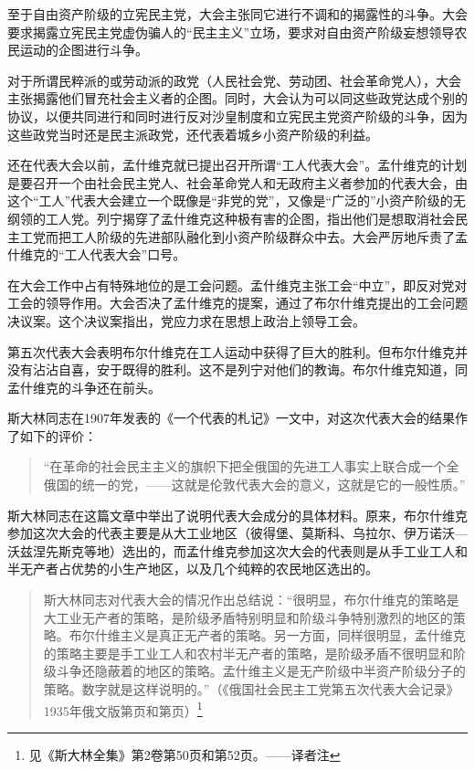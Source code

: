 至于自由资产阶级的立宪民主党，大会主张同它进行不调和的揭露性的斗争。大会要求揭露立宪民主党虚伪骗人的“民主主义”立场，要求对自由资产阶级妄想领导农民运动的企图进行斗争。

对于所谓民粹派的或劳动派的政党（人民社会党、劳动团、社会革命党人），大会主张揭露他们冒充社会主义者的企图。同时，大会认为可以同这些政党达成个别的协议，以便共同进行和同时进行反对沙皇制度和立宪民主党资产阶级的斗争，因为这些政党当时还是民主派政党，还代表着城乡小资产阶级的利益。

还在代表大会以前，孟什维克就已提出召开所谓“工人代表大会”。孟什维克的计划是要召开一个由社会民主党人、社会革命党人和无政府主义者参加的代表大会，由这个“工人”代表大会建立一个既像是“非党的党”，又像是“广泛的”小资产阶级的无纲领的工人党。列宁揭穿了孟什维克这种极有害的企图，指出他们是想取消社会民主工党而把工人阶级的先进部队融化到小资产阶级群众中去。大会严厉地斥责了孟什维克的“工人代表大会”口号。

在大会工作中占有特殊地位的是工会问题。孟什维克主张工会“中立”，即反对党对工会的领导作用。大会否决了孟什维克的提案，通过了布尔什维克提出的工会问题决议案。这个决议案指出，党应力求在思想上政治上领导工会。

第五次代表大会表明布尔什维克在工人运动中获得了巨大的胜利。但布尔什维克并没有沾沾自喜，安于既得的胜利。这不是列宁对他们的教诲。布尔什维克知道，同孟什维克的斗争还在前头。

斯大林同志在1907年发表的《一个代表的札记》一文中，对这次代表大会的结果作了如下的评价：

\begin{quotation}
“在革命的社会民主主义的旗帜下把全俄国的先进工人事实上联合成一个全俄国的统一的党，——这就是伦敦代表大会的意义，这就是它的一般性质。”
\end{quotation}

斯大林同志在这篇文章中举出了说明代表大会成分的具体材料。原来，布尔什维克参加这次大会的代表主要是从大工业地区（彼得堡、莫斯科、乌拉尔、伊万诺沃—沃兹涅先斯克等地）选出的，而孟什维克参加这次大会的代表则是从手工业工人和半无产者占优势的小生产地区，以及几个纯粹的农民地区选出的。

\begin{quotation}
斯大林同志对代表大会的情况作出总结说：“很明显，布尔什维克的策略是大工业无产者的策略，是阶级矛盾特别明显和阶级斗争特别激烈的地区的策略。布尔什维主义是真正无产者的策略。另一方面，同样很明显，孟什维克的策略主要是手工业工人和农村半无产者的策略，是阶级矛盾不很明显和阶级斗争还隐蔽着的地区的策略。孟什维主义是无产阶级中半资产阶级分子的策略。数字就是这样说明的。”（《俄国社会民主工党第五次代表大会记录》1935年俄文版第页和第页）\footnote{见《斯大林全集》第2卷第50页和第52页。——译者注}
\end{quotation}


